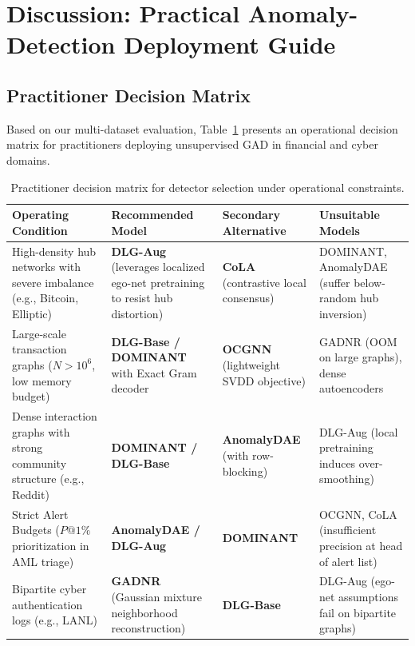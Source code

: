 \documentclass[applsci,article,submit,moreauthors,pdftex]{Definitions/mdpi}
\begin{document}
\section{Discussion: Practical Anomaly-Detection Deployment Guide}
\label{sec:discussion}

\subsection{Practitioner Decision Matrix}
Based on our multi-dataset evaluation, Table~\ref{tab:decision_matrix} presents an operational decision matrix for practitioners deploying unsupervised GAD in financial and cyber domains.

\begin{table}[htbp]
\centering\footnotesize\setlength{\tabcolsep}{4pt}
\caption{Practitioner decision matrix for detector selection under operational constraints.}
\label{tab:decision_matrix}
\begin{tabularx}{\textwidth}{>{\raggedright\arraybackslash}p{}>{\raggedright\arraybackslash}X>{\raggedright\arraybackslash}X>{\raggedright\arraybackslash}p{}}\toprule
\textbf{Operating Condition} & \textbf{Recommended Model} & \textbf{Secondary Alternative} & \textbf{Unsuitable Models} \\\midrule
High-density hub networks with severe imbalance (e.g., Bitcoin, Elliptic) & \textbf{DLG-Aug} (leverages localized ego-net pretraining to resist hub distortion) & \textbf{CoLA} (contrastive local consensus) & DOMINANT, AnomalyDAE (suffer below-random hub inversion) \\
Large-scale transaction graphs ($N > 10^6$, low memory budget) & \textbf{DLG-Base / DOMINANT} with Exact Gram decoder & \textbf{OCGNN} (lightweight SVDD objective) & GADNR (OOM on large graphs), dense autoencoders \\
Dense interaction graphs with strong community structure (e.g., Reddit) & \textbf{DOMINANT / DLG-Base} & \textbf{AnomalyDAE} (with row-blocking) & DLG-Aug (local pretraining induces over-smoothing) \\
Strict Alert Budgets ($P@1\%$ prioritization in AML triage) & \textbf{AnomalyDAE / DLG-Aug} & \textbf{DOMINANT} & OCGNN, CoLA (insufficient precision at head of alert list) \\
Bipartite cyber authentication logs (e.g., LANL) & \textbf{GADNR} (Gaussian mixture neighborhood reconstruction) & \textbf{DLG-Base} & DLG-Aug (ego-net assumptions fail on bipartite graphs) \\\bottomrule
\end{tabularx}
\end{table}
\end{document}
